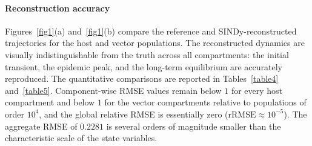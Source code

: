 \documentclass[9pt]{article}
\numberwithin{equation}{section}
\begin{document}
\paragraph{Reconstruction accuracy}\label{sec:sindy-clean-accuracy}
Figures~\ref{fig1}(a) and~\ref{fig1}(b) compare the reference and SINDy-reconstructed trajectories for the host and vector populations. The reconstructed dynamics are visually indistinguishable from the truth across all compartments: the initial transient, the epidemic peak, and the long-term equilibrium are accurately reproduced. The quantitative comparisons are reported in Tables~\ref{table4} and~\ref{table5}. Component-wise RMSE values remain below $1$ for every host compartment and below $1$ for the vector compartments relative to populations of order $10^{4}$, and the global relative RMSE is essentially zero ($\mathrm{rRMSE} \approx 10^{-5}$). The aggregate RMSE of $0.2281$ is several orders of magnitude smaller than the characteristic scale of the state variables.
 
\end{document}
